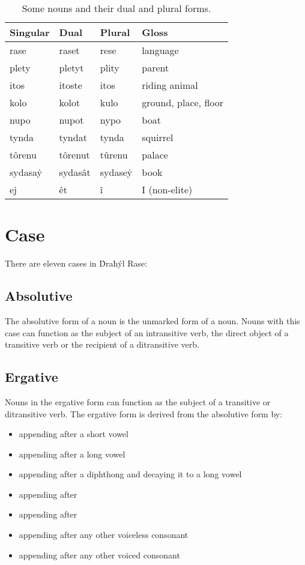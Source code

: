 \documentclass{book}
\begin{document}
\begin{table}[h]
    \caption{Some nouns and their dual and plural forms.}
    \centering
    \begin{tabular}{|l|l|l|l|}
        \hline
        Singular & Dual & Plural & Gloss \\
        \hline
        rase & raset & rese & language \\
        plety & pletyt & plity & parent \\
        itos & itoste & itos & riding animal \\
        kolo & kolot & kulo & ground, place, floor \\
        nupo & nupot & nypo & boat \\
        tynda & tyndat & tynda & squirrel \\
        tôrenu & tôrenut & tûrenu & palace \\
        sydasaẏ & sydasât & sydaseẏ & book \\
        ej & êt & î & I (non-elite) \\
        \hline
    \end{tabular}
\end{table}


\section{Case}

There are eleven cases in Ḋraħýl Rase:

\subsection{Absolutive}

The absolutive form of a noun is the unmarked form of a noun. Nouns with this case can function as the subject of an intransitive verb, the direct object of a transitive verb or the recipient of a ditransitive verb.

\subsection{Ergative}

Nouns in the ergative form can function as the subject of a transitive or ditransitive verb. The ergative form is derived from the absolutive form by:

\begin{itemize}
    \item appending  after a short vowel
    \item appending  after a long vowel
    \item appending  after a diphthong and decaying it to a long vowel
    \item appending  after 
    \item appending  after 
    \item appending  after any other voiceless consonant
    \item appending  after any other voiced consonant
\end{itemize}
\end{document}
